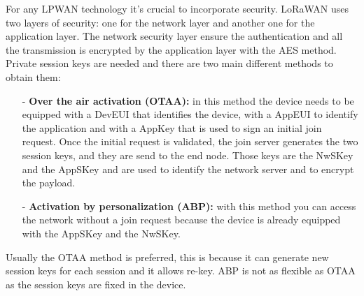 For any LPWAN technology it's crucial to incorporate security.
LoRaWAN uses two layers of security: one for the network layer and
another one for the application layer. The network security layer ensure
the authentication and all the transmission is encrypted by the
application layer with the AES method. Private session keys are needed
and there are two main different methods to obtain them:
\begin{itemize}
    \item[-] {\bfseries Over the air activation (OTAA):} in this method the device needs
to be equipped with a DevEUI that identifies the device, with a
AppEUI to identify the application and with a AppKey that is used
to sign an initial join request. Once the initial request is validated,
the join server generates the two session keys, and they are send
to the end node. Those keys are the NwSKey and the AppSKey
and are used to identify the network server and to encrypt the
payload.
    \item[-] {\bfseries Activation by personalization (ABP):} with this method you can
access the network without a join request because the device is
already equipped with the AppSKey and the NwSKey.
\end{itemize}
Usually the OTAA method is preferred, this is because it can generate
new session keys for each session and it allows re-key. ABP is not as
flexible as OTAA as the session keys are fixed in the device.
